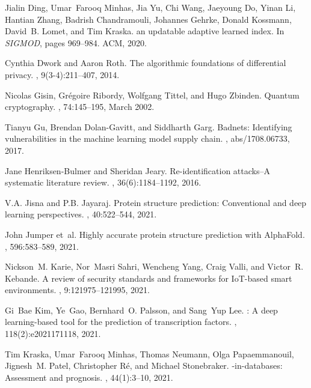 \documentclass[11pt]{article}
\begin{document}
\begin{thebibliography}{10}
Jialin Ding, Umar~Farooq Minhas, Jia Yu, Chi Wang, Jaeyoung Do, Yinan Li,
  Hantian Zhang, Badrish Chandramouli, Johannes Gehrke, Donald Kossmann,
  David~B. Lomet, and Tim Kraska.
 an updatable adaptive learned index.
\newblock In {\em SIGMOD}, pages 969--984. {ACM}, 2020.

Cynthia Dwork and Aaron Roth.
\newblock The algorithmic foundations of differential privacy.
, 9(3-4):211--407, 2014.

Nicolas Gisin, Gr\'egoire Ribordy, Wolfgang Tittel, and Hugo Zbinden.
\newblock Quantum cryptography.
, 74:145--195, March 2002.

Tianyu Gu, Brendan Dolan{-}Gavitt, and Siddharth Garg.
\newblock Badnets: Identifying vulnerabilities in the machine learning model
  supply chain.
, abs/1708.06733, 2017.

Jane Henriksen{-}Bulmer and Sheridan Jeary.
\newblock Re-identification attacks--{A} systematic literature review.
, 36(6):1184--1192, 2016.

V.A. Jisna and P.B. Jayaraj.
\newblock Protein structure prediction: Conventional and deep learning
  perspectives.
, 40:522--544, 2021.

John Jumper et~al.
\newblock Highly accurate protein structure prediction with {AlphaFold}.
, 596:583--589, 2021.

Nickson~M. Karie, Nor~Masri Sahri, Wencheng Yang, Craig Valli, and Victor~R.
  Kebande.
\newblock A review of security standards and frameworks for {I}o{T}-based smart
  environments.
, 9:121975--121995, 2021.

Gi~Bae Kim, Ye~Gao, Bernhard~O. Palsson, and Sang~Yup Lee.
: A deep learning-based tool for the prediction of
  transcription factors.
, 118(2):e2021171118, 2021.

Tim Kraska, Umar~Farooq Minhas, Thomas Neumann, Olga Papaemmanouil, Jignesh~M.
  Patel, Christopher R{\'{e}}, and Michael Stonebraker.
-in-databases: Assessment and prognosis.
, 44(1):3--10, 2021.


\end{thebibliography}
\end{document}
